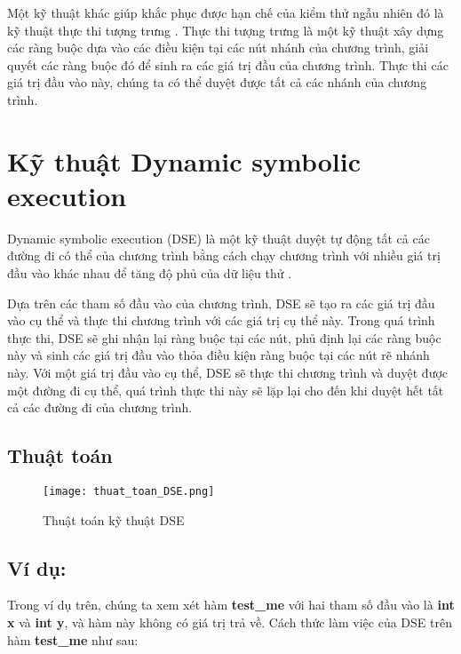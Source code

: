 Một kỹ thuật khác giúp khắc phục được hạn chế của kiểm thử ngẫu nhiên đó là kỹ thuật thực thi tượng trưng \cite{king1976symbolic}. Thực thi tượng trưng là một kỹ thuật xây dựng các ràng buộc dựa vào các điều kiện tại các nút nhánh của chương trình, giải quyết các ràng buộc đó để sinh ra các giá trị  đầu của chương trình. Thực thi các giá trị đầu vào này, chúng ta có thể duyệt được tất cả các nhánh của chương trình. 


\section{Kỹ thuật Dynamic symbolic execution}

Dynamic symbolic execution (DSE) là một kỹ thuật duyệt tự động tất cả các đường đi có thể của chương trình bằng cách chạy chương trình với nhiều giá trị đầu vào khác nhau để tăng độ phủ của dữ liệu thử \cite{xie2009fitness}.

Dựa trên các tham số đầu vào của chương trình, DSE sẽ tạo ra các giá trị đầu vào cụ thể và thực thi chương trình với các giá trị cụ thể này. Trong quá trình thực thi, DSE sẽ ghi nhận lại ràng buộc tại các nút, phủ định lại các ràng buộc này và sinh các giá trị đầu vào thỏa điều kiện ràng buộc tại các nút rẽ nhánh này. Với một giá trị đầu vào cụ thể, DSE sẽ thực thi chương trình và duyệt được một đường đi cụ thể, quá trình thực thi này sẽ lặp lại cho đến khi duyệt hết tất cả các đường đi của chương trình.

\subsection*{Thuật toán}
\begin{center}
	\begin{figure}[htp]
		\begin{center}
			\texttt{[image: thuat\_toan\_DSE.png]}
		\end{center}
		\caption{Thuật toán kỹ thuật DSE}
		\label{refhinh1}
	\end{figure}
\end{center}


\subsection*{Ví dụ:}


	
Trong ví dụ trên, chúng ta xem xét hàm \textbf{test\_me} với hai tham số đầu vào là \textbf{int x} và \textbf{int y}, và hàm này không có giá trị trả về. Cách thức làm việc của DSE trên hàm \textbf{test\_me} như sau: 

